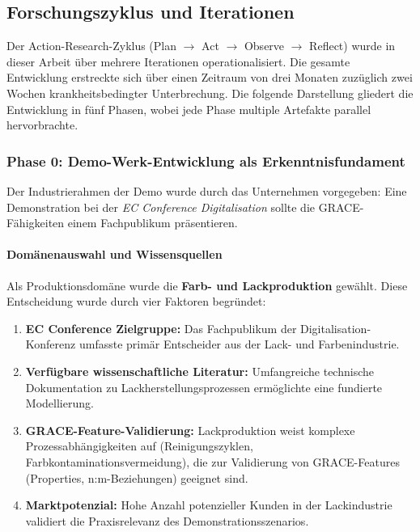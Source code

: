 \subsection{Forschungszyklus und Iterationen}
\label{subsec:Forschungszyklus}

Der Action-Research-Zyklus (Plan $\rightarrow$ Act $\rightarrow$ Observe $\rightarrow$ Reflect) wurde in dieser Arbeit über mehrere Iterationen operationalisiert. Die gesamte Entwicklung erstreckte sich über einen Zeitraum von drei Monaten zuzüglich zwei Wochen krankheitsbedingter Unterbrechung. Die folgende Darstellung gliedert die Entwicklung in fünf Phasen, wobei jede Phase multiple Artefakte parallel hervorbrachte.


\subsubsection{Phase 0: Demo-Werk-Entwicklung als Erkenntnisfundament}
\label{subsubsec:Phase0}

Der Industrierahmen der Demo wurde durch das Unternehmen vorgegeben: Eine Demonstration bei der \textit{EC Conference Digitalisation} sollte die GRACE-Fähigkeiten einem Fachpublikum präsentieren.

\paragraph{Domänenauswahl und Wissensquellen}

Als Produktionsdomäne wurde die \textbf{Farb- und Lackproduktion} gewählt. Diese Entscheidung wurde durch vier Faktoren begründet:

\begin{enumerate}
    \item \textbf{EC Conference Zielgruppe:} Das Fachpublikum der Digitalisation-Konferenz umfasste primär Entscheider aus der Lack- und Farbenindustrie.
    \item \textbf{Verfügbare wissenschaftliche Literatur:} Umfangreiche technische Dokumentation zu Lackherstellungsprozessen ermöglichte eine fundierte Modellierung.
    \item \textbf{GRACE-Feature-Validierung:} Lackproduktion weist komplexe Prozessabhängigkeiten auf (Reinigungszyklen, Farbkontaminationsvermeidung), die zur Validierung von GRACE-Features (Properties, n:m-Beziehungen) geeignet sind.
    \item \textbf{Marktpotenzial:} Hohe Anzahl potenzieller Kunden in der Lackindustrie validiert die Praxisrelevanz des Demonstrationsszenarios.
\end{enumerate}

